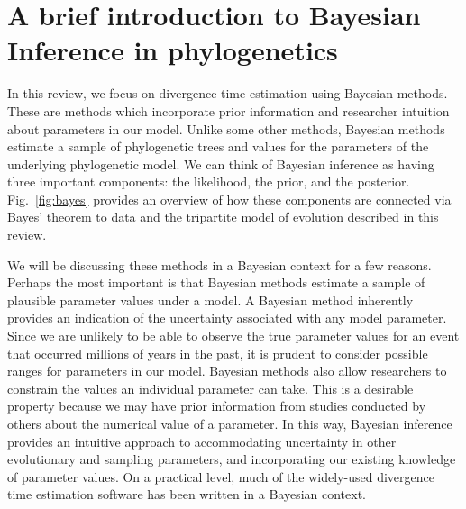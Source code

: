 \documentclass[11pt]{article}
\newcommand{\rw}[1]{{\textcolor{red}{[RW: #1]}}} %
\newcommand{\aw}[1]{{\textcolor{armygreen}{[AW: #1]}}} %
\begin{document}
\section{A brief introduction to Bayesian Inference in phylogenetics}

In this review, we focus on divergence time estimation using Bayesian methods. 
These are methods which incorporate prior information and researcher intuition about parameters in our model.
Unlike some other methods, Bayesian methods estimate a sample of phylogenetic trees and values for the parameters of the underlying phylogenetic model.
We can think of Bayesian inference as having three important components: the likelihood, the prior, and the posterior.
Fig.\ \ref{fig:bayes} provides an overview of how these components are connected via Bayes' theorem to data and the tripartite model of evolution described in this review. %

We will be discussing these methods in a Bayesian context for a few reasons.
Perhaps the most important is that Bayesian methods estimate a sample of plausible parameter values under a model. 
A Bayesian method inherently provides an indication of the uncertainty associated with any model parameter.
Since we are unlikely to be able to observe the true parameter values for an event that occurred millions of years in the past, it is prudent to consider possible ranges for parameters in our model.
Bayesian methods also allow researchers to constrain the values an individual parameter can take. 
This is a desirable property because we may have prior information from studies conducted by others about the numerical value of a parameter.
In this way, Bayesian inference provides an intuitive approach to accommodating uncertainty in other evolutionary and sampling parameters, and incorporating our existing knowledge of parameter values.
On a practical level, much of the widely-used divergence time estimation software has been written in a Bayesian context.

\end{document}
